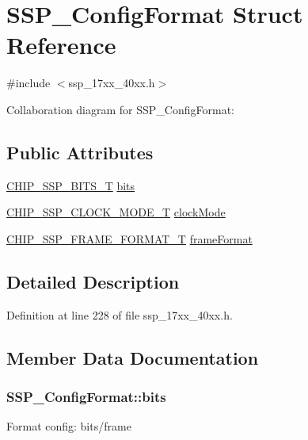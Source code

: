 \hypertarget{structSSP__ConfigFormat}{}\section{S\+S\+P\+\_\+\+Config\+Format Struct Reference}
\label{structSSP__ConfigFormat}


{\ttfamily \#include $<$ssp\+\_\+17xx\+\_\+40xx.\+h$>$}



Collaboration diagram for S\+S\+P\+\_\+\+Config\+Format\+:
\subsection*{Public Attributes}
\begin{DoxyCompactItemize}
\item 
\hyperlink{group__SSP__17XX__40XX_ga4e348748c4fb42ef94c2cbd968a43648}{C\+H\+I\+P\+\_\+\+S\+S\+P\+\_\+\+B\+I\+T\+S\+\_\+T} \hyperlink{structSSP__ConfigFormat_afaeb54b5e0525adda38644d3ef84dca1}{bits}
\item 
\hyperlink{group__SSP__17XX__40XX_ga12dec81e345a9ffbefd6a1fae5759e09}{C\+H\+I\+P\+\_\+\+S\+S\+P\+\_\+\+C\+L\+O\+C\+K\+\_\+\+M\+O\+D\+E\+\_\+T} \hyperlink{structSSP__ConfigFormat_a910e709c7d9e6e367a26028a939b69cf}{clock\+Mode}
\item 
\hyperlink{group__SSP__17XX__40XX_ga207687847d9ab8385057ddeca53c2942}{C\+H\+I\+P\+\_\+\+S\+S\+P\+\_\+\+F\+R\+A\+M\+E\+\_\+\+F\+O\+R\+M\+A\+T\+\_\+T} \hyperlink{structSSP__ConfigFormat_ae702ac713d3aa81bffdf140ad8942ec7}{frame\+Format}
\end{DoxyCompactItemize}


\subsection{Detailed Description}


Definition at line 228 of file ssp\+\_\+17xx\+\_\+40xx.\+h.



\subsection{Member Data Documentation}
\subsubsection[{\texorpdfstring{bits}{bits}}]{ S\+S\+P\+\_\+\+Config\+Format\+::bits}\hypertarget{structSSP__ConfigFormat_afaeb54b5e0525adda38644d3ef84dca1}{}\label{structSSP__ConfigFormat_afaeb54b5e0525adda38644d3ef84dca1}
Format config\+: bits/frame 

